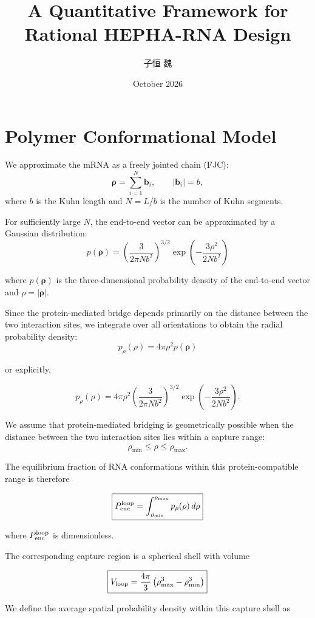 \documentclass{article}
\title{A Quantitative Framework for Rational HEPHA-RNA Design}
\author{子恒 魏}
\date{October 2026}
\begin{document}
\maketitle




\section{Polymer Conformational Model}

We approximate the mRNA as a freely jointed chain (FJC):
\[
\boldsymbol{\rho}
=
\sum_{i=1}^{N}\mathbf b_i,
\qquad
|\mathbf b_i|=b,
\]
where \(b\) is the Kuhn length and \(N=L/b\) is the number of Kuhn segments.

For sufficiently large \(N\), the end-to-end vector can be approximated by a Gaussian distribution:
\[
\boxed{
p(\boldsymbol{\rho})
=
\left(
\frac{3}{2\pi Nb^2}
\right)^{3/2}
\exp\left(
-\frac{3\rho^2}{2Nb^2}
\right)
}
\]

where \(p(\boldsymbol{\rho})\) is the three-dimensional probability density of the end-to-end vector and
\(\rho=|\boldsymbol{\rho}|\).

Since the protein-mediated bridge depends primarily on the distance between the two interaction sites, we integrate over all orientations to obtain the radial probability density:
\[
\boxed{
p_{\rho}(\rho)
=
4\pi \rho^2 p(\boldsymbol{\rho})
}
\]

or explicitly,

\[
p_{\rho}(\rho)
=
4\pi \rho^2
\left(
\frac{3}{2\pi Nb^2}
\right)^{3/2}
\exp\left(
-\frac{3\rho^2}{2Nb^2}
\right).
\]

We assume that protein-mediated bridging is geometrically possible when the distance between the two interaction sites lies within a capture range:
\[
\rho_{\min}\leq \rho\leq \rho_{\max}.
\]

The equilibrium fraction of RNA conformations within this protein-compatible range is therefore

\[
\boxed{
P_{\rm enc}^{\rm loop}
=
\int_{\rho_{\min}}^{\rho_{\max}}
p_{\rho}(\rho)\,d\rho
}
\]

where \(P_{\rm enc}^{\rm loop}\) is dimensionless.

The corresponding capture region is a spherical shell with volume

\[
\boxed{
V_{\rm loop}
=
\frac{4\pi}{3}
\left(
\rho_{\max}^3-\rho_{\min}^3
\right)
}
\]

We define the average spatial probability density within this capture shell as
\end{document}
